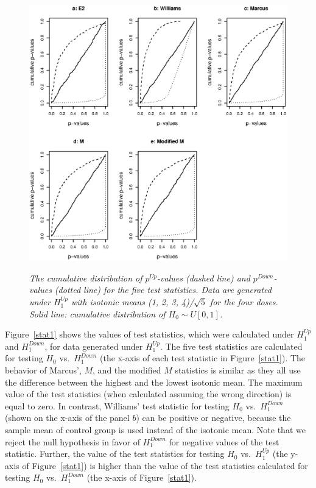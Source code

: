 \begin{figure}[!h]
\centering
{\includegraphics[width=.9\textwidth]{pupdn1b.eps}}
\caption{\em{The cumulative distribution of $p^{Up}$-values (dashed
line) and $p^{Down}$-values (dotted line) for the five test
statistics. Data are generated under $H_1^{Up}$ with isotonic means
(1, 2, 3, 4)/$\sqrt{5}$ for the four doses. Solid line: cumulative
distribution of $H_0\sim U[0,1]$.}} \label{pupdn1}
\end{figure}


Figure~\ref{stat1} shows the values of test statistics, which were
calculated under $H^{Up}_1$ and $H^{Down}_1$, for data generated
under $H^{Up}_1$. The five test statistics are calculated for
testing $H_0$ vs.\ $H^{Down}_1$ (the x-axis of each test statistic
in Figure~\ref{stat1}). The behavior of Marcus', $M$, and the
modified $M$ statistics is similar as they all use the difference
between the highest and the lowest isotonic mean.
The maximum value of the test statistics (when calculated assuming
the wrong direction) is equal to zero. In contrast, Williams' test
statistic for testing $H_0$ vs.\ $H^{Down}_1$ (shown on the x-axis
of the panel $b$) can be positive or negative, because the sample
mean of control group is used instead of the isotonic mean. Note
that we reject the null hypothesis in favor of $H^{Down}_1$ for
negative values of the test statistic. Further, the value of the
test statistics for testing $H_0$ vs.\ $H^{Up}_1$ (the y-axis of
Figure~\ref{stat1}) is higher than the value of the test statistics
calculated for testing $H_0$ vs.\ $H^{Down}_1$ (the x-axis of
Figure~\ref{stat1}).



